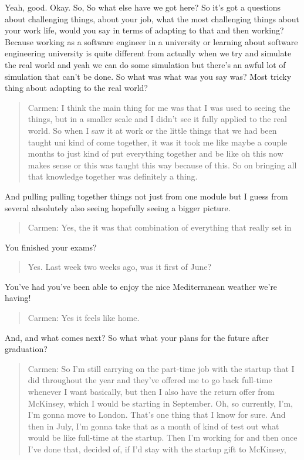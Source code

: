 \documentclass[
]{book}
\begin{document}
Yeah, good. Okay. So, So what else have we got here? So it's got a questions about challenging things, about your job, what the most challenging things about your work life, would you say in terms of adapting to that and then working? Because working as a software engineer in a university or learning about software engineering university is quite different from actually when we try and simulate the real world and yeah we can do some simulation but there's an awful lot of simulation that can't be done. So what was what was you say was? Most tricky thing about adapting to the real world?

\begin{quote}
Carmen: I think the main thing for me was that I was used to seeing the things, but in a smaller scale and I didn't see it fully applied to the real world. So when I saw it at work or the little things that we had been taught uni kind of come together, it was it took me like maybe a couple months to just kind of put everything together and be like oh this now makes sense or this was taught this way because of this. So on bringing all that knowledge together was definitely a thing.
\end{quote}

And pulling pulling together things not just from one module but I guess from several absolutely also seeing hopefully seeing a bigger picture.

\begin{quote}
Carmen: Yes, the it was that combination of everything that really set in
\end{quote}

You finished your exams?

\begin{quote}
Yes. Last week two weeks ago, was it first of June?
\end{quote}

You've had you've been able to enjoy the nice Mediterranean weather we're having!

\begin{quote}
Carmen: Yes it feels like home.
\end{quote}

And, and what comes next? So what what your plans for the future after graduation?

\begin{quote}
Carmen: So I'm still carrying on the part-time job with the startup that I did throughout the year and they've offered me to go back full-time whenever I want basically, but then I also have the return offer from McKinsey, which I would be starting in September. Oh, so currently, I'm, I'm gonna move to London. That's one thing that I know for sure. And then in July, I'm gonna take that as a month of kind of test out what would be like full-time at the startup. Then I'm working for and then once I've done that, decided of, if I'd stay with the startup gift to McKinsey,
\end{quote}
\end{document}

